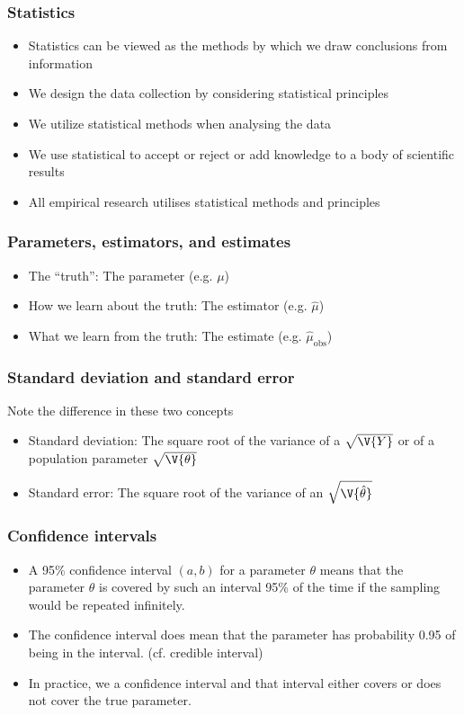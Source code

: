 \documentclass[compress]{beamer}\usepackage[]{graphicx}\usepackage[]{xcolor}
\begin{document}
\begin{frame}[fragile]
  \frametitle{Statistics}
    \begin{itemize}
      \item Statistics can be viewed as the methods by which we draw conclusions from  information
      \item We design the data collection by considering statistical principles
      \item We utilize statistical methods when analysing the data
      \item We use statistical  to accept or reject  or add knowledge to a body of scientific results
      \item All empirical research utilises statistical methods and principles
    \end{itemize}
\end{frame}


\begin{frame}[fragile]
  \frametitle{Parameters, estimators, and estimates}
    \begin{itemize}
      \item The ``truth'': The parameter (e.g. $\mu$)
      \item How we learn about the truth: The estimator (e.g. $\hat{\mu}$)
      \item What we learn from the truth: The estimate (e.g. $\hat{\mu}_{\mathrm{obs}}$)
    \end{itemize}
\end{frame}


\begin{frame}[fragile]
  \frametitle{Standard deviation and standard error}
    Note the difference in these two concepts
      \begin{itemize}
        \item Standard deviation: The square root of the variance of a  $\sqrt{\V{Y}}$ or of a population parameter $\sqrt{\V{\theta}}$
        \item Standard error: The square root of the variance of an  $\sqrt{\V{\hat{\theta}}}$
      \end{itemize}
\end{frame}


\begin{frame}[fragile]
  \frametitle{Confidence intervals}
    \begin{itemize}
      \item A 95\% confidence interval $(a, b)$ for a parameter $\theta$ means that the parameter $\theta$ is covered by such an interval 95\% of the time if the sampling would be repeated infinitely.
      \item The confidence interval does  mean that the parameter has probability 0.95 of being in the interval. (cf. credible interval)
      \item In practice, we  a confidence interval and that interval either covers or does not cover the true parameter.
    \end{itemize}
\end{frame}
\end{document}
